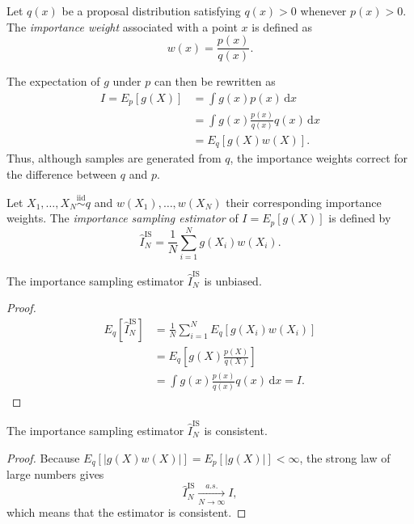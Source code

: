 \begin{definition}
Let $q(x)$ be a proposal distribution satisfying $q(x)>0$ whenever $p(x)>0$. 
The \emph{importance weight} associated with a point $x$ is defined as
\begin{equation}
    w(x) = \frac{p(x)}{q(x)}.
    \label{eq:importance_weight}
\end{equation}
\end{definition}

The expectation of $g$ under $p$ can then be rewritten as
\begin{align}
    I = E_p[g(X)] &= \int g(x)p(x)\,\mathrm{d}x \\
    &= \int g(x)\frac{p(x)}{q(x)}q(x)\,\mathrm{d}x \\
    &= E_q\left[g(X)w(X)\right].
\end{align}
Thus, although samples are generated from $q$, the importance weights correct for the difference between $q$ and $p$.

\begin{definition}
Let $X_1,\ldots,X_N \overset{\mathrm{iid}}{\sim} q$ and $w(X_1),\ldots,w(X_N)$ their corresponding importance weights.
The \emph{importance sampling estimator} of $I=E_p[g(X)]$ is defined by
\begin{equation}
    \hat{I}_N^{\mathrm{IS}} = \frac{1}{N} \sum_{i=1}^N g(X_i)w(X_i).
    \label{eq:importance_sampling_estimator}
\end{equation}
\end{definition}
\begin{proposition}
    \label{prop:importance_sampling_unbiased}
    The importance sampling estimator $\hat{I}_N^{\mathrm{IS}}$ is unbiased.
\end{proposition}
\begin{proof}
    \begin{align}
        E_q[\hat{I}_N^{\mathrm{IS}}] &= \frac{1}{N}\sum_{i=1}^N E_q[g(X_i)w(X_i)] \\
        &= E_q\left[g(X)\frac{p(X)}{q(X)}\right] \\
        &= \int g(x)\frac{p(x)}{q(x)}q(x)\,\mathrm{d}x = I.
    \end{align}
\end{proof}

\begin{proposition}
    \label{prop:importance_sampling_consistent}
    The importance sampling estimator $\hat{I}_N^{\mathrm{IS}}$ is consistent.
\end{proposition}
\begin{proof}
    Because $E_q[|g(X)w(X)|] = E_p[|g(X)|] < \infty$, the strong law of large numbers gives
    \begin{equation}
        \hat{I}_N^{\mathrm{IS}} \xrightarrow[N\to\infty]{a.s.} I,
    \end{equation}
    which means that the estimator is consistent.
\end{proof}

